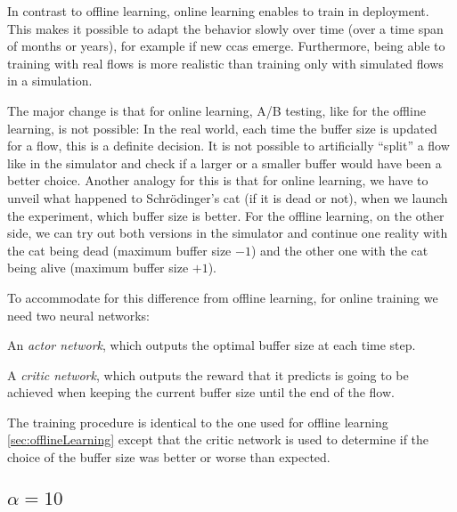 \documentclass[conference]{IEEEtran}
\begin{document}
In contrast to offline learning, online learning enables to train in deployment. This makes it possible to adapt the behavior slowly over time (over a time span of months or years), for example if new \glspl{cca} emerge. Furthermore, being able to training with real flows is more realistic than training only with simulated flows in a simulation. 

The major change is that for online learning, A/B testing, like for the offline learning, is not possible: In the real world, each time the buffer size is updated for a flow, this is a definite decision. It is not possible to artificially ``split'' a flow like in the simulator and check if a larger or a smaller buffer would have been a better choice. Another analogy for this is that for online learning, we have to unveil what happened to Schrödinger's cat (if it is dead or not), when we launch the experiment, which buffer size is better. For the offline learning, on the other side, we can try out both versions in the simulator and continue one reality with the cat being dead (maximum buffer size $-1$) and the other one with the cat being alive (maximum buffer size $+1$). 

To accommodate for this difference from offline learning, for online training we need two neural networks: 
\begin{itemize*}
\item An \textit{actor network}, which outputs the optimal buffer size at each time step.
\item A \textit{critic network}, which outputs the reward that it predicts is going to be achieved when keeping the current buffer size until the end of the flow. 
\end{itemize*}

The training procedure is identical to the one used for offline learning \autoref{sec:offlineLearning} except that the critic network is used to determine if the choice of the buffer size was better or worse than expected. 

\subsection{$\alpha=10$}
\end{document}
